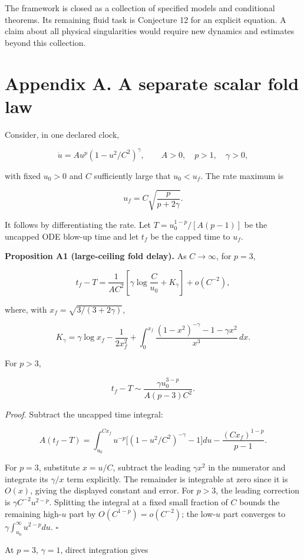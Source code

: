 \documentclass[
  11pt,
  a4paper,
]{article}
\begin{document}
The framework is closed as a collection of specified models and conditional theorems. Its remaining fluid task is Conjecture 12 for an explicit equation. A claim about all physical singularities would require new dynamics and estimates beyond this collection.

\section{Appendix A. A separate scalar fold law}\label{appendix-a.-a-separate-scalar-fold-law}

Consider, in one declared clock,

\[
\dot u=Au^p(1-u^2/C^2)^\gamma,
\qquad A>0,\quad p>1,\quad\gamma>0,
\]

with fixed \(u_0>0\) and \(C\) sufficiently large that \(u_0<u_f\). The rate maximum is

\[
u_f=C\sqrt{\frac{p}{p+2\gamma}}.
\]

It follows by differentiating the rate. Let \(T=u_0^{1-p}/[A(p-1)]\) be the uncapped ODE blow-up time and let \(t_f\) be the capped time to \(u_f\).

\textbf{Proposition A1 (large-ceiling fold delay).} As \(C\to\infty\), for \(p=3\),

\[
t_f-T=\frac1{AC^2}
\left[\gamma\log\frac C{u_0}+K_\gamma\right]+o(C^{-2}),
\]

where, with \(x_f=\sqrt{3/(3+2\gamma)}\),

\[
K_\gamma=\gamma\log x_f-\frac1{2x_f^2}
+\int_0^{x_f}\frac{(1-x^2)^{-\gamma}-1-\gamma x^2}{x^3}\,dx.
\]

For \(p>3\),

\[
t_f-T\sim\frac{\gamma u_0^{3-p}}{A(p-3)C^2}.
\]

\emph{Proof.} Subtract the uncapped time integral:

\[
A(t_f-T)=\int_{u_0}^{Cx_f}u^{-p}
\big[(1-u^2/C^2)^{-\gamma}-1\big]du
-\frac{(Cx_f)^{1-p}}{p-1}.
\]

For \(p=3\), substitute \(x=u/C\), subtract the leading \(\gamma x^2\) in the numerator and integrate its \(\gamma/x\) term explicitly. The remainder is integrable at zero since it is \(O(x)\), giving the displayed constant and error. For \(p>3\), the leading correction is \(\gamma C^{-2}u^{2-p}\). Splitting the integral at a fixed small fraction of \(C\) bounds the remaining high-\(u\) part by \(O(C^{1-p})=o(C^{-2})\); the low-\(u\) part converges to \(\gamma\int_{u_0}^\infty u^{2-p}du\). \(\square\)

At \(p=3\), \(\gamma=1\), direct integration gives
\end{document}
